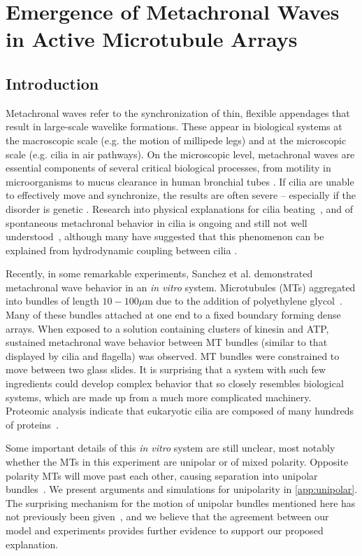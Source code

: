 \documentclass[11pt]{ucthesis}
\begin{document}
\chapter{Emergence of Metachronal Waves in Active Microtubule Arrays}
\label{chap:metachronal}

\section{Introduction}
Metachronal waves refer to the synchronization of thin, flexible
appendages that result in large-scale wavelike formations. These
appear in biological systems at the macroscopic scale (e.g. the
motion of millipede legs) and at the microscopic scale (e.g. cilia
in air pathways). On the microscopic level, metachronal waves are
essential components of several critical biological processes, from
motility in microorganisms to mucus clearance in human bronchial
tubes \cite{Afzelius2004,Okada2005}. If cilia are unable to effectively
move and synchronize, the results are often severe -- especially
if the disorder is genetic \cite{Afzelius2004}. Research into
physical explanations for cilia beating~\cite{brokaw1975molecular}, and of spontaneous metachronal behavior in cilia
is ongoing and still not well understood~\cite{camalet1999self,lindemann2010flagellar}, although many have suggested
that this phenomenon can be explained from hydrodynamic coupling
between cilia \cite{Sleigh1969,Sleigh1974,Gheber1989,Gueron1997}.

Recently, in some remarkable experiments, Sanchez et al. demonstrated metachronal wave behavior in
an \textit{in vitro} system\cite{Sanchez2011,sanchez2013engineering}.  
Microtubules (MTs) aggregated into bundles of length $10-100 \mu\mathrm{m}$ due to the addition of
polyethylene glycol~\cite{needleman2004synchrotron}.
Many of these bundles attached at one end
to a fixed boundary forming dense arrays. When exposed to a solution
containing clusters of kinesin and ATP, sustained metachronal wave
behavior between MT bundles (similar to that displayed by cilia and
flagella) was observed. MT bundles were constrained to move between
two glass slides. It is surprising that a system with such few ingredients
could develop complex behavior that so closely
resembles biological systems, which are made up from a much
more complicated machinery. Proteomic analysis indicate that eukaryotic cilia are
composed of many hundreds of proteins~\cite{pazour2005proteomic}.

Some important details of this
\textit{in vitro} system are still unclear, most notably whether the
MTs in this experiment are unipolar or of mixed polarity. 
Opposite polarity MTs will move past each other, causing separation
into unipolar bundles~\cite{kruse2000actively,liverpool2003instabilities}. 
We present arguments and simulations for unipolarity in 
\ref{app:unipolar}.
The surprising mechanism for the motion of unipolar bundles mentioned here
has not previously been given~\cite{Sanchez2011,sanchez2013engineering}, 
and we believe that the agreement between our model and
experiments provides further evidence to support our proposed explanation. 
\end{document}
